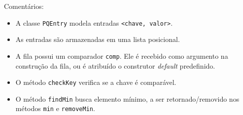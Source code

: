 \medskip

{\color{redtext}
Comentários:
\begin{itemize}
	\item A classe \texttt{PQEntry} modela entradas \texttt{<chave, valor>}.
	\item As entradas são armazenadas em uma lista posicional.
	\item A fila possui um comparador \texttt{comp}. Ele é recebido como argumento na construção da fila, ou é atribuído o construtor \textit{default} predefinido.
	\item O método \texttt{checkKey} verifica se a chave é comparável.
	\item O método \texttt{findMin} busca elemento mínimo, a ser retornado/removido nos métodos \texttt{min} e \texttt{removeMin}.
\end{itemize}
}

\medskip

